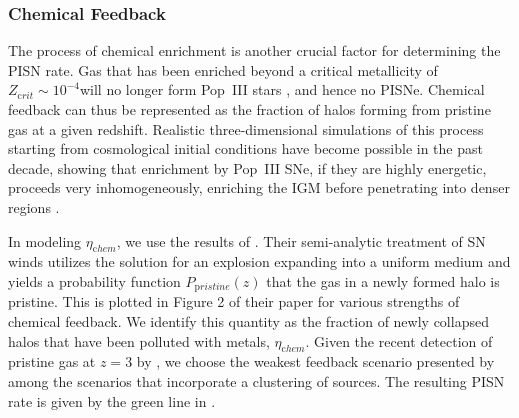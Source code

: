\documentclass[../thesis.tex]{subfiles}
\begin{document}
\subsubsection{Chemical Feedback}
The process of chemical enrichment is another crucial factor for
determining the PISN rate.  Gas that has been enriched beyond a
critical metallicity of $Z_{\mathrm crit} \sim 10^{-4}$\zsun will
no longer form Pop~III stars \citep{BrommKudritzkiLoeb2001,
  Schneideretal2002, BrommLoeb2003}, and hence no PISNe.  Chemical
feedback can thus be represented as the fraction of halos forming from
pristine gas at a given redshift.  Realistic three-dimensional
simulations of this process starting from cosmological initial
conditions have become possible in the past decade, showing that
enrichment by Pop~III SNe, if they are highly energetic, proceeds very
inhomogeneously, enriching the IGM before penetrating into denser
regions \citep{Scannapiecoetal2005, Greifetal2007,
  TornatoreFerraraSchneider2007,WiseAbel2008, Maioetal2010}.

In modeling $\eta_{\mathrm chem}$, we use the results of
\citet{FurlanettoLoeb2005}.  Their semi-analytic treatment of SN winds
utilizes the \citet{Sedov1959} solution for an explosion expanding
into a uniform medium and yields a probability function $P_{\mathrm
  pristine}(z)$ that the gas in a newly formed halo is pristine.  This
is plotted in Figure 2 of their paper for various strengths of
chemical feedback.  We identify this quantity as the fraction of newly
collapsed halos that have been polluted with metals, $\eta_{\mathrm
  chem}$.  Given the recent detection of pristine gas at $z = 3$ by
\citet{FumagalliOMearaProchaska2011}, we choose the weakest feedback
scenario presented by \citet{FurlanettoLoeb2005} among the scenarios
that incorporate a clustering of sources. The resulting PISN rate is
given by the green line in .
\end{document}

